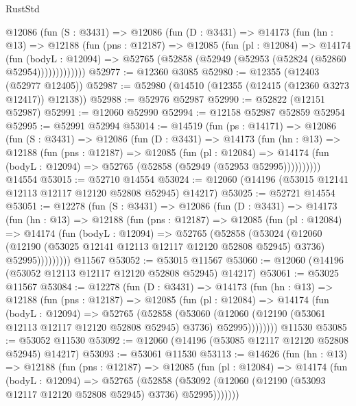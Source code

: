 \begin{lexlean}{RustStd}
\begin{coremodule}
      @12086
        (fun (S : @3431) =>
        @12086
          (fun (D : @3431) =>
          @14173
            (fun (hn : @13) =>
            @12188
              (fun (pns : @12187) =>
              @12085
                (fun (pl : @12084) =>
                @14174
                  (fun (bodyL : @12094) =>
                  @52765 (@52858 (@52949 (@52953 (@52824 (@52860 @52954)))))))))))))
@52977 := @12360 @3085
@52980 := @12355 (@12403 (@52977 @12405))
@52987 := @52980 (@14510 (@12355 (@12415 (@12360 @3273 @12417)) @12138))
@52988 := @52976 @52987
@52990 := @52822 (@12151 @52987)
@52991 := @12060 @52990
@52994 := @12158 @52987 @52859 @52954
@52995 := @52991 @52994
@53014 := @14519
    (fun (ps : @14171) =>
    @12086
      (fun (S : @3431) =>
      @12086
        (fun (D : @3431) =>
        @14173
          (fun (hn : @13) =>
          @12188
            (fun (pns : @12187) =>
            @12085
              (fun (pl : @12084) =>
              @14174 (fun (bodyL : @12094) => @52765 (@52858 (@52949 (@52953 @52995))))))))))
    @14554
@53015 := @52710 @14554
@53024 := @12060 (@14196 (@53015 @12141 @12113 @12117 @12120 @52808 @52945) @14217)
@53025 := @52721 @14554
@53051 := @12278
    (fun (S : @3431) =>
    @12086
      (fun (D : @3431) =>
      @14173
        (fun (hn : @13) =>
        @12188
          (fun (pns : @12187) =>
          @12085
            (fun (pl : @12084) =>
            @14174
              (fun (bodyL : @12094) =>
              @52765
                (@52858
                  (@53024
                    (@12060
                      (@12190 (@53025 @12141 @12113 @12117 @12120 @52808 @52945) @3736)
                      @52995)))))))))
    @11567
@53052 := @53015 @11567
@53060 := @12060 (@14196 (@53052 @12113 @12117 @12120 @52808 @52945) @14217)
@53061 := @53025 @11567
@53084 := @12278
    (fun (D : @3431) =>
    @14173
      (fun (hn : @13) =>
      @12188
        (fun (pns : @12187) =>
        @12085
          (fun (pl : @12084) =>
          @14174
            (fun (bodyL : @12094) =>
            @52765
              (@52858
                (@53060
                  (@12060 (@12190 (@53061 @12113 @12117 @12120 @52808 @52945) @3736) @52995))))))))
    @11530
@53085 := @53052 @11530
@53092 := @12060 (@14196 (@53085 @12117 @12120 @52808 @52945) @14217)
@53093 := @53061 @11530
@53113 := @14626
    (fun (hn : @13) =>
    @12188
      (fun (pns : @12187) =>
      @12085
        (fun (pl : @12084) =>
        @14174
          (fun (bodyL : @12094) =>
          @52765
            (@52858
              (@53092 (@12060 (@12190 (@53093 @12117 @12120 @52808 @52945) @3736) @52995)))))))

\end{coremodule}
\end{lexlean}
